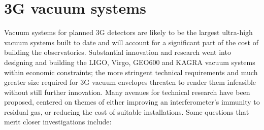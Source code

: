 \section{3G vacuum systems}
Vacuum systems for planned 3G detectors are likely to be the largest ultra-high vacuum systems built to date and will account for a significant part of the cost of building the observatories. Substantial innovation and research went into designing and building the LIGO, Virgo, GEO600 and KAGRA vacuum systems within economic constraints; the more stringent technical requirements and much greater size required for 3G vacuum envelopes threaten to render them infeasible without still further innovation. Many avenues for technical research have been proposed,  centered on themes of either improving an interferometer’s immunity to residual gas, or reducing the cost of suitable installations. Some questions that merit closer investigations include:

